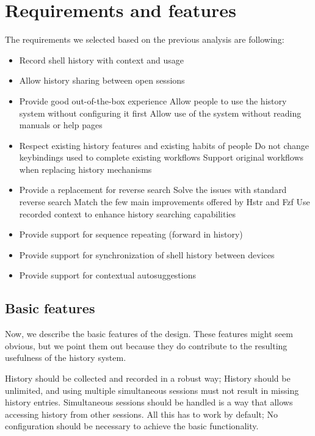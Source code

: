 \newpage
\section{Requirements and features}


The requirements we selected based on the previous analysis are following:

\begin{itemize}
\item Record shell history with context and usage
\item Allow history sharing between open sessions
\item Provide good out-of-the-box experience
\subitem Allow people to use the history system without configuring it first
\subitem Allow use of the system without reading manuals or help pages
\item Respect existing history features and existing habits of people
\subitem Do not change keybindings used to complete existing workflows
\subitem Support original workflows when replacing history mechanisms
\item Provide a replacement for reverse search
\subitem Solve the issues with standard reverse search
\subitem Match the few main improvements offered by Hstr and Fzf
\subitem Use recorded context to enhance history searching capabilities
\item Provide support for sequence repeating (forward in history)
\item Provide support for synchronization of shell history between devices
\item Provide support for contextual autosuggestions
\end{itemize}



\subsection{Basic features}

Now, we describe the basic features of the design. These features might seem obvious, but we point them out because they do contribute to the resulting usefulness of the history system.

History should be collected and recorded in a robust way; History should be unlimited, and using multiple simultaneous sessions must not result in missing history entries. 
Simultaneous sessions should be handled is a way that allows accessing history from other sessions.
All this has to work by default; No configuration should be necessary to achieve the basic functionality. 

